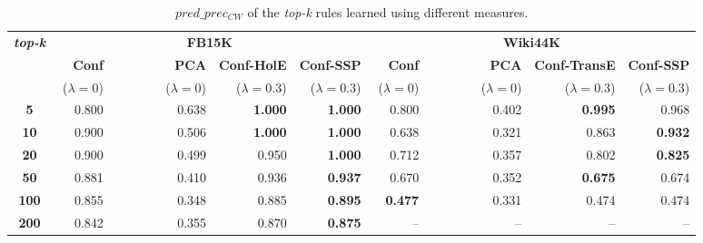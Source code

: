 \begin{table}[t]
\scriptsize
\centering
\begin{tabular}{c |r r r r |r r r r} 
 \multirow{3}{*}{\textbf{\textit{top-k}}} & \multicolumn{4}{c}{\textbf{FB15K}} & \multicolumn{4}{|c}{\textbf{Wiki44K}} \\
 \cmidrule{2-9}
 & \textbf{{~~}Conf}&  \textbf{{~~~~~~~~}PCA} & \textbf{Conf-HolE}& \textbf{Conf-SSP} &  \textbf{{~~}Conf}&  \textbf{{~~~~~~~~}PCA} & \textbf{Conf-TransE}& \textbf{Conf-SSP}\\
  & {\scriptsize($\lambda=0$)}  & {\scriptsize($\lambda=0$)} & {\scriptsize($\lambda=0.3$)} & {\scriptsize($\lambda=0.3$)} & {\scriptsize($\lambda=0$)} & {\scriptsize($\lambda=0$)} &{\scriptsize($\lambda=0.3$)} & {\scriptsize($\lambda=0.3$)}\\
 \midrule
 \textbf{5} & 0.800 & 0.638 & \textbf{1.000} & \textbf{1.000} & 0.800 & 0.402 & \textbf{0.995} & 0.968\\
\textbf{10} & 0.900 & 0.506 & \textbf{1.000} & \textbf{1.000} & 0.638 & 0.321 & 0.863 & \textbf{0.932} \\
\textbf{20} & 0.900 & 0.499 & 0.950 & \textbf{1.000} & 0.712 & 0.357 & 0.802 & \textbf{0.825}\\
\textbf{50} & 0.881 & 0.410 & 0.936 & \textbf{0.937} & 0.670 & 0.352 & \textbf{0.675} & 0.674 \\
\textbf{100} & 0.855 & 0.348 & 0.885 & \textbf{0.895} & \textbf{0.477} & 0.331 & 0.474 & 0.474\\
\textbf{200} & 0.842 & 0.355 & 0.870 & \textbf{0.875} & -- & -- & -- & -- \\
 \bottomrule
\end{tabular}
\caption{$pred\_prec_{CW}$ of the \textit{top-k} rules learned using different measures.}
\label{table:avg_quality}
\vspace*{-3mm}
\end{table}
